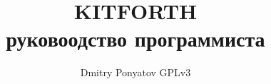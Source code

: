 

\author{Dmitry Ponyatov  GPLv3}
\title{KITFORTH\\руковоодство программиста}



\maketitle
\tableofcontents



